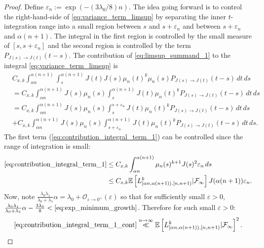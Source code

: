 \documentclass{article}
\numberwithin{equation}{section}
\newcommand{\llas}[2]{\overset{{#1}\to {#2}}{\ll}}
\begin{document}
\begin{proof}
  
  Define $\varepsilon_n:=\exp(-(3\lambda_0/8)n)$. The idea going forward is to control the right-hand-side of \ref{eq:variance_term_limsup} by separating the inner $t$-integration range into a small region between $s$ and $s+\varepsilon_n$ and between $s+\varepsilon_n$ and $\alpha(n+1)$. The integral in the first region is controlled by the small measure of $[s,s+\varepsilon_n]$ and the second region is controlled by the term $P_{J(s)\to J(t)}(t-s)$. The contribution of \ref{eq:limsup_summand_1} to the integral \ref{eq:variance_term_limsup} is
  \begin{align}
    &C_{x,k}\int_{\alpha n}^{\alpha(n+1)}\int_{s}^{\alpha(n+1)}J(t)J(s)\mu_n(t)^k\mu_n(s)P_{J(s)\to J(t)}(t-s)\,dt\,ds\nonumber\\
    &=C_{x,k}\int_{\alpha n}^{\alpha(n+1)}J(s)\mu_n(s)\int_{s}^{\alpha(n+1)}J(t)\mu_n(t)^kP_{J(s)\to J(t)}(t-s)\,dt\,ds\nonumber\\
    &=C_{x,k}\int_{\alpha n}^{\alpha(n+1)}J(s)\mu_n(s)\int_{s}^{s+\varepsilon_n}J(t)\mu_n(t)^kP_{J(s)\to J(t)}(t-s)\,dt\,ds\label{eq:contribution_integral_term_1}\\
    &+C_{x,k}\int_{\alpha n}^{\alpha(n+1)}J(s)\mu_n(s)\int_{s+\varepsilon_n}^{\alpha(n+1)}J(t)\mu_n(t)^kP_{J(s)\to J(t)}(t-s)\,dt\,ds.\label{eq:contribution_integral_term_2}
  \end{align}
  The first term (\ref{eq:contribution_integral_term_1}) can be controlled since the range of integration is small:
  \begin{align}
    \ref{eq:contribution_integral_term_1}
    &\leq C_{x,k}\int_{\alpha n}^{\alpha(n+1)}\mu_n(s)^{k+1}J(s)^2\varepsilon_n\,ds\nonumber\\
    &\leq C_{x,k}\mathbb{E}\left[L_{[\alpha n,\alpha (n+1)),[n,n+1)}^{k}|\mathcal{F}_\infty\right] J(\alpha(n+1))\varepsilon_n.\label{eq:contribution_integral_term_1_cont}
  \end{align}
  Now, note $\frac{\lambda_0\lambda_1}{\lambda_0+\lambda_1}\alpha=\lambda_0+\mathcal{O}_{\varepsilon\to 0^+}(\varepsilon)$ so that for sufficiently small $\varepsilon>0$, $\frac{\lambda_0\lambda_1}{\lambda_0+\lambda_1}\alpha-\frac{3\lambda_0}{8}<\ref{eq:exp_minimum_growth}$. Therefore for such small $\varepsilon>0$:
  \begin{align*}
    \ref{eq:contribution_integral_term_1_cont}\llas{n}{\infty}\mathbb{E}\left[L_{[\alpha n,\alpha (n+1)),[n,n+1)}^{k}|\mathcal{F}_\infty\right]^2.
  \end{align*}


\end{proof}
\end{document}
